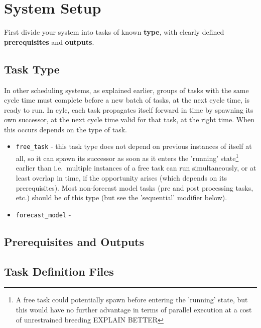 \documentclass[11pt,a4paper]{article}
\begin{document}
\pagebreak
\label{sec:tasktype}
\section{System Setup}

First divide your system into tasks of known {\bf type}, with clearly
defined {\bf prerequisites} and {\bf outputs}.

\label{sec:tasktype}
\subsection{Task Type}

In other scheduling systems, as explained earlier, groups of tasks with
the same cycle time must complete before a new batch of tasks, at the
next cycle time, is ready to run. In cylc, each task propagates itself
forward in time by spawning its own successor, at the next cycle time 
valid for that task, at the right time. When this occurs depends on the
type of task. 

\begin{itemize}
    \item \lstinline=free_task= - this task type does not depend on
        previous instances of itself at all, so it can spawn its
        successor as soon as it enters the 'running'
        state\footnote{A free task could potentially spawn before
        entering the 'running' state, but this would have no further
        advantage in terms of parallel execution at a cost of
        unrestrained breeding EXPLAIN BETTER} earlier than
        i.e.\ multiple instances of a free task can run simultaneously,
        or at least overlap in time, if the opportunity arises (which
        depends on its prerequisites). Most non-forecast model tasks
        (pre and post processing tasks, etc.) should be of this type
        (but see the 'sequential' modifier below).    

    \item \lstinline=forecast_model= - 
\end{itemize}


\label{sec:requisites}
\subsection{Prerequisites and Outputs}


\pagebreak
\label{sec:taskdef}
\subsection{Task Definition Files}
\end{document}
